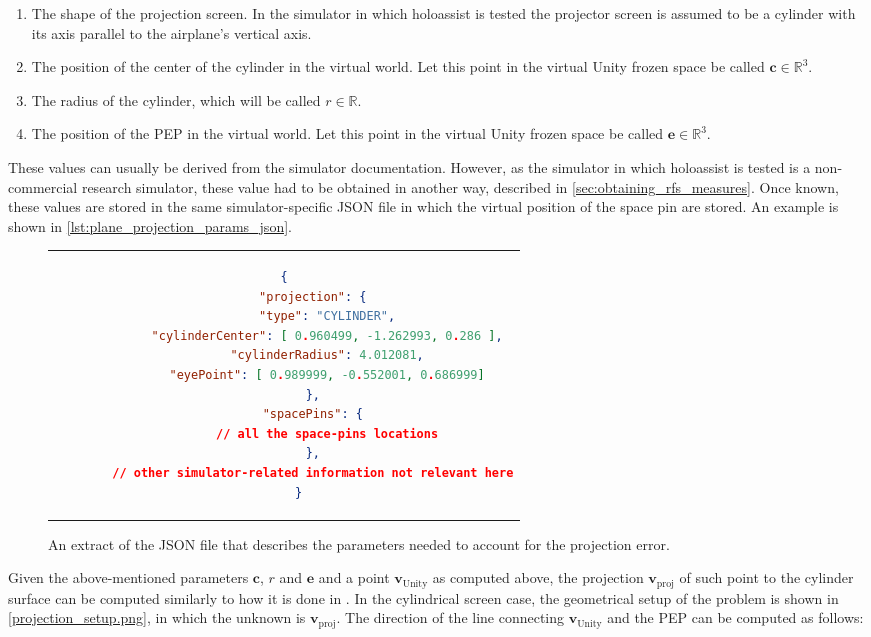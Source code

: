 \begin{enumerate}
    \item The shape of the projection screen. In the simulator in which \gls{holoassist} is tested the projector screen is assumed to be a cylinder with its axis parallel to the airplane's vertical axis.
    \item The position of the center of the cylinder in the virtual world. Let this point in the virtual Unity frozen space be called $\mathbf{c} \in \mathbb{R}^3$.
    \item The radius of the cylinder, which will be called $r \in \mathbb{R}$.
    \item The position of the \gls{PEP} in the virtual world. Let this point in the virtual Unity frozen space be called $\mathbf{e} \in \mathbb{R}^3$.
\end{enumerate}

These values can usually be derived from the simulator documentation. However, as the simulator in which \gls{holoassist} is tested is a non-commercial research simulator, these value had to be obtained in another way, described in \autoref{sec:obtaining_rfs_measures}. Once known, these values are stored in the same simulator-specific JSON file in which the virtual position of the space pin are stored. An example is shown in \autoref{lst:plane_projection_params_json}.

\begin{figure}
  \centering
  \begin{tabular}{c}
  \begin{lstlisting}[language=json]
    {
        "projection": {
            "type": "CYLINDER",
            "cylinderCenter": [ 0.960499, -1.262993, 0.286 ],
            "cylinderRadius": 4.012081,
            "eyePoint": [ 0.989999, -0.552001, 0.686999]
        },
        "spacePins": {
            // all the space-pins locations
        },
        // other simulator-related information not relevant here
    }
  \end{lstlisting}
  \end{tabular}
  \caption{An extract of the JSON file that describes the parameters needed to account for the projection error.}\label{lst:plane_projection_params_json}
\end{figure}

Given the above-mentioned parameters $\mathbf{c}$, $r$ and $\mathbf{e}$ and a point $\mathbf{v}_{\text{Unity}}$ as computed above, the projection $\mathbf{v}_{\text{proj}}$ of such point to the cylinder surface can be computed similarly to how it is done in \cite{walko_integration_2020}. In the cylindrical screen case, the geometrical setup of the problem is shown in \autoref{projection_setup.png}, in which the unknown is $\mathbf{v}_{\text{proj}}$. The direction of the line connecting $\mathbf{v}_{\text{Unity}}$ and the \gls{PEP} can be computed as follows:

